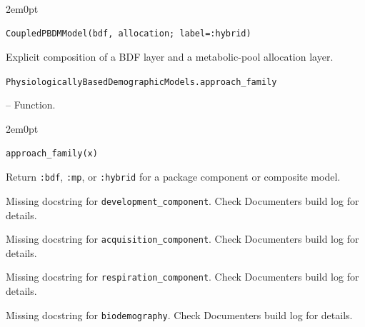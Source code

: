 \begin{adjustwidth}{2em}{0pt}


\begin{verbatim}
CoupledPBDMModel(bdf, allocation; label=:hybrid)
\end{verbatim}

Explicit composition of a BDF layer and a metabolic-pool allocation layer.



\end{adjustwidth}
\hypertarget{10866144080477223834}{\texttt{PhysiologicallyBasedDemographicModels.approach\_family}}  -- {Function.}

\begin{adjustwidth}{2em}{0pt}


\begin{verbatim}
approach_family(x)
\end{verbatim}

Return \texttt{:bdf}, \texttt{:mp}, or \texttt{:hybrid} for a package component or composite model.



\end{adjustwidth}

\begin{tcolorbox}[toptitle=-1mm,bottomtitle=1mm,colback=admonition-warning!50!white,colframe=admonition-warning,title=\textbf{Missing docstring.}]
Missing docstring for \texttt{development\_component}. Check Documenter{\textquotesingle}s build log for details.

\end{tcolorbox}


\begin{tcolorbox}[toptitle=-1mm,bottomtitle=1mm,colback=admonition-warning!50!white,colframe=admonition-warning,title=\textbf{Missing docstring.}]
Missing docstring for \texttt{acquisition\_component}. Check Documenter{\textquotesingle}s build log for details.

\end{tcolorbox}


\begin{tcolorbox}[toptitle=-1mm,bottomtitle=1mm,colback=admonition-warning!50!white,colframe=admonition-warning,title=\textbf{Missing docstring.}]
Missing docstring for \texttt{respiration\_component}. Check Documenter{\textquotesingle}s build log for details.

\end{tcolorbox}


\begin{tcolorbox}[toptitle=-1mm,bottomtitle=1mm,colback=admonition-warning!50!white,colframe=admonition-warning,title=\textbf{Missing docstring.}]
Missing docstring for \texttt{biodemography}. Check Documenter{\textquotesingle}s build log for details.

\end{tcolorbox}


